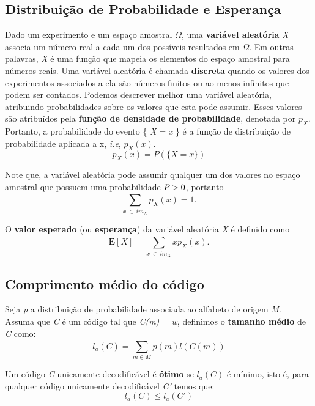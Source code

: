 \subsection{Distribuição de Probabilidade e Esperança}
Dado um experimento e um espaço amostral $\Omega$, uma \textbf{variável aleatória} \emph{X} associa um número real a cada um dos possíveis resultados em $\Omega$. Em outras palavras, \emph{X} é uma função que mapeia os elementos do espaço amostral para números reais. Uma variável aleatória é chamada \textbf{discreta} quando os valores dos experimentos associados a ela são números finitos ou ao menos infinitos que podem ser contados.
Podemos descrever melhor uma variável aleatória, atribuindo probabilidades sobre os valores que esta pode assumir. Esses valores são atribuídos pela \textbf{função de densidade de probabilidade}, denotada por \emph{$p_X$}. Portanto, a probabilidade do evento \{ \emph{X} = \emph{x} \} é a função de distribuição de probabilidade aplicada a x, \emph{i.e}, \emph{$p_X(x)$}.
\begin{equation} \label{eq:dist_prob_def}
p_X(x) = P(\{X = x\})
\end{equation}

Note que, a variável aleatória pode assumir qualquer um dos valores no espaço amostral que possuem uma probabilidade $\emph{P} > 0$, portanto
\begin{equation} \label{eq:dist_prob_sum}
\sum_{x ~\in ~im_X}^{}p_X(x) = 1.
\end{equation}

O \textbf{valor esperado} (ou \textbf{esperança}) da variável aleatória \emph{X} é definido como
\begin{equation} \label{eq:exp_val}
\textbf{E}[X] = \sum_{x ~\in ~im_X}^{} xp_X(x).
\end{equation}
\subsection{Comprimento médio do código}
Seja \emph{p} a distribuição de probabilidade associada ao alfabeto de origem \emph{M}. Assuma que \emph{C} é um código tal que \emph{C(m)} = \emph{w}, definimos o \textbf{tamanho médio} de \emph{C} como:
\begin{equation} \label{eq:code_len}
l_a (C) = \sum_{m \in M}^{} p(m) l(C(m))
\end{equation}

Um código \emph{C} unicamente decodificável é \textbf{ótimo} se $l_a(C)$ é mínimo, isto é, para qualquer código unicamente decodificável \emph{C'} temos que:
\begin{equation} \label{eq:code_len_optimal}
l_a(C) \leq l_a(C')
\end{equation}

